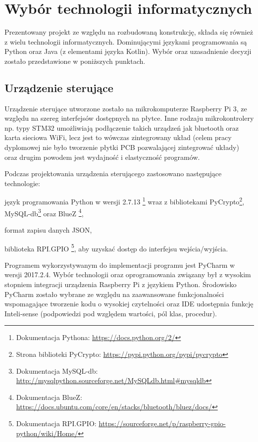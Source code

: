 \newpage\section{Wybór technologii informatycznych} \label{sec:technologie}
Prezentowany projekt ze względu na rozbudowaną konstrukcję, składa się również z wielu technologii informatycznych. Dominującymi językami programowania są Python oraz Java (z elementami języka Kotlin). Wybór oraz uzasadnienie decyzji zostało przedstawione w poniższych punktach.

\subsection{Urządzenie sterujące}
Urządzenie sterujące utworzone zostało na mikrokomputerze Raspberry Pi 3, ze względu na szereg interfejsów dostępnych na płytce. Inne rodzaju mikrokontrolery np. typy STM32 umożliwiają podłączenie takich urządzeń jak bluetooth oraz karta sieciowa WiFi, lecz jest to wówczas zintegrowany układ (celem pracy dyplomowej nie było tworzenie płytki PCB pozwalającej zintegrować układy) oraz drugim powodem jest wydajność i elastyczność programów. 

Podczas projektowania urządzenia sterującego zastosowano następujące technologie:
\begin{itemize*}
	\item język programowania Python w wersji 2.7.13 \footnote{ Dokumentacja Pythona: \href {https://docs.python.org/2/}{https://docs.python.org/2/}} wraz z bibliotekami PyCrypto\footnote{ Strona biblioteki PyCrypto: \href{https://pypi.python.org/pypi/pycrypto}{https://pypi.python.org/pypi/pycrypto}}, MySQL-db\footnote{ Dokumentacja MySQL-db: \href{http://mysql-python.sourceforge.net/MySQLdb.html\#mysqldb}{http://mysql\-python.sourceforge.net/MySQLdb.html\#mysqldb}} oraz BlueZ \footnote{ Dokumentacja BlueZ: \href{https://docs.ubuntu.com/core/en/stacks/bluetooth/bluez/docs/}{https://docs.ubuntu.com/core/en/stacks/bluetooth/bluez/docs/}},
	\item format zapisu danych JSON,
	\item biblioteka RPI.GPIO
	 \footnote{ Dokumentacja RPI.GPIO: \href{https://sourceforge.net/p/raspberry-gpio-python/wiki/Home/}{\mbox{https://sourceforge.net/p/raspberry-gpio-python/wiki/Home/}}}, aby uzyskać dostęp do interfejsu wejścia/wyjścia.
\end{itemize*}

Programem wykorzystywanym do implementacji programu jest PyCharm w wersji 2017.2.4. Wybór technologii oraz oprogramowania związany był z wysokim stopniem integracji urządzenia Raspberry Pi z językiem Python. Środowisko PyCharm zostało wybrane ze względu na zaawansowane funkcjonalności wspomagające tworzenie kodu o wysokiej czytelności oraz IDE udostępnia funkcję Inteli-sense (podpowiedzi pod względem wartości, pól klas, procedur).

